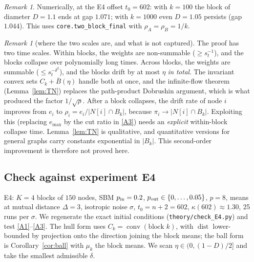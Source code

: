 \documentclass[11pt]{article}
\theoremstyle{definition}
\theoremstyle{remark}
\newtheorem{remark}[theorem]{Remark}
\newcommand{\dist}{\operatorname{dist}}
\newcommand{\conv}{\operatorname{conv}}
\begin{document}
\begin{remark}
Numerically, at the E4 offset $t_0=602$: with $k=100$ the block of diameter $D=1.1$ ends at gap
$1.071$; with $k=1000$ even $D=1.05$ persists (gap $1.044$). This uses \texttt{core.two\_block\_final}
with $\rho_A=\rho_B=1/k$.
\end{remark}

\begin{remark}[where the two scales are, and what is not captured]\label{rem:twoscale}
The proof has two time scales. Within blocks, the weights are non-summable ($\ge s_t^{-1}$), and the
blocks collapse over polynomially long times. Across blocks, the weights are summable ($\le s_t^{-\delta^2}$),
and the blocks drift by at most $\eta$ \emph{in total}. The invariant convex sets $C_k+\bar B(\eta)$ handle
both at once, and the infinite-flow theorem (Lemma~\ref{lem:TN}) replaces the path-product Dobrushin
argument, which is what produced the factor $1/\sqrt\rho$. After a block collapses, the drift rate of node $i$
improves from $e_i$ to $\rho_i=e_i/|N[i]\cap B_k|$, because $\pi_i\to|N[i]\cap B_k|$. Exploiting this
(replacing $e_{\max}$ by the cut ratio in \eqref{A3}) needs an \emph{explicit} within-block collapse time.
Lemma~\ref{lem:TN} is qualitative, and quantitative versions for general graphs carry constants exponential in
$|B_k|$. This second-order improvement is therefore not proved here.
\end{remark}

\subsection{Check against experiment E4}
E4: $K=4$ blocks of $150$ nodes, SBM $p_{\rm in}=0.2$, $p_{\rm out}\in\{0,\dots,0.05\}$, $p=8$, means at
mutual distance $\Delta=3$, isotropic noise $\sigma$, $t_0=n+2=602$, $\kappa(602)\approx1.30$, 25 runs per $\sigma$.
We regenerate the exact initial conditions (\texttt{theory/check\_E4.py}) and test
\eqref{A1}--\eqref{A3}. The hull form uses $C_k=\conv(\text{block }k)$, with $\dist$ lower-bounded by projection
onto the direction joining the block means; the ball form is Corollary~\ref{cor:ball} with $\mu_k$ the block
means. We scan $\eta\in(0,(1-D)/2]$ and take the smallest admissible $\delta$.
\end{document}
